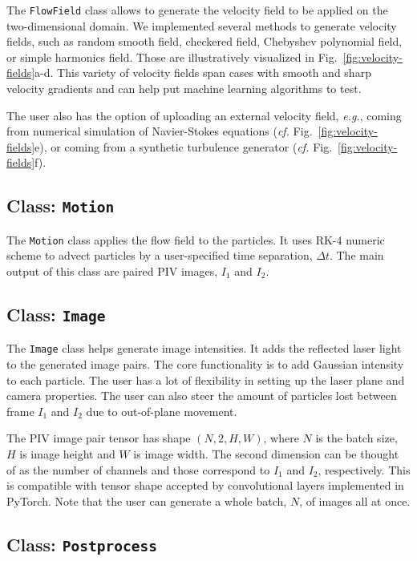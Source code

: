 \documentclass[a4paper,fleqn]{cas-dc}
\begin{document}
The \texttt{FlowField} class allows to generate the velocity field to be applied on the two-dimensional domain. We implemented several methods to generate velocity fields, such as random smooth field, checkered field, Chebyshev polynomial field, or simple harmonics field. Those are illustratively visualized in Fig.~\ref{fig:velocity-fields}a-d. This variety of velocity fields span cases with smooth and sharp velocity gradients and can help put machine learning algorithms to test.

The user also has the option of uploading an external velocity field, \textit{e.g.}, coming from numerical simulation of Navier-Stokes equations (\textit{cf.} Fig.~\ref{fig:velocity-fields}e), or coming from a synthetic turbulence generator (\textit{cf.} Fig.~\ref{fig:velocity-fields}f).

\subsection{Class: \texttt{Motion}} \label{sec:class-particle}

The \texttt{Motion} class applies the flow field to the particles. It uses RK-4 numeric scheme to advect particles by a user-specified time separation, $\Delta t$. The main output of this class are paired PIV images, $I_1$ and $I_2$.

\subsection{Class: \texttt{Image}} \label{sec:class-particle}

The \texttt{Image} class helps generate image intensities. It adds the reflected laser light to the generated image pairs. The core functionality is to add Gaussian intensity to each particle. The user has a lot of flexibility in setting up the laser plane and camera properties. The user can also steer the amount of particles lost between frame $I_1$ and $I_2$ due to out-of-plane movement.

The PIV image pair tensor has shape $(N, 2, H, W)$, where $N$ is the batch size, $H$ is image height and $W$ is image width. The second dimension can be thought of as the number of channels and those correspond to $I_1$ and $I_2$, respectively. This is compatible with tensor shape accepted by convolutional layers implemented in PyTorch. Note that the user can generate a whole batch, $N$, of images all at once.

\subsection{Class: \texttt{Postprocess}} \label{sec:class-particle}
\end{document}
